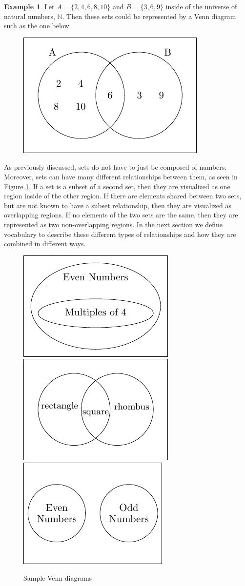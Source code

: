 \documentclass[
]{book}
\theoremstyle{definition}
\theoremstyle{definition}
\newtheorem{example}{Example}[chapter]
\theoremstyle{definition}
\theoremstyle{definition}
\theoremstyle{remark}
\begin{document}
\begin{example}

Let \(A=\{2, 4, 6, 8, 10\}\) and \(B=\{3, 6, 9\}\) inside of the universe of natural numbers, \(\mathbb{N}\). Then these sets could be represented by a Venn diagram such as the one below.

\begin{figure}

{\centering \includegraphics[width=0.35\linewidth]{tikz/VennEx2-1-6} 

}

\end{figure}

\end{example}

As previously discussed, sets do not have to just be composed of numbers. Moreover, sets can have many different relationships between them, as seen in Figure \ref{fig:venn-samples}. If a set is a subset of a second set, then they are visualized as one region inside of the other region. If there are elements shared between two sets, but are not known to have a subset relationship, then they are visualized as overlapping regions. If no elements of the two sets are the same, then they are represented as two non-overlapping regions. In the next section we define vocabulary to describe these different types of relationships and how they are combined in different ways.

\begin{figure}

{\centering \includegraphics[width=0.3\linewidth]{tikz/evenfours} \includegraphics[width=0.3\linewidth]{tikz/rectsqrhombus} \includegraphics[width=0.3\linewidth]{tikz/evenodd} 

}

\caption{Sample Venn diagrams}\label{fig:venn-samples}
\end{figure}
\end{document}

